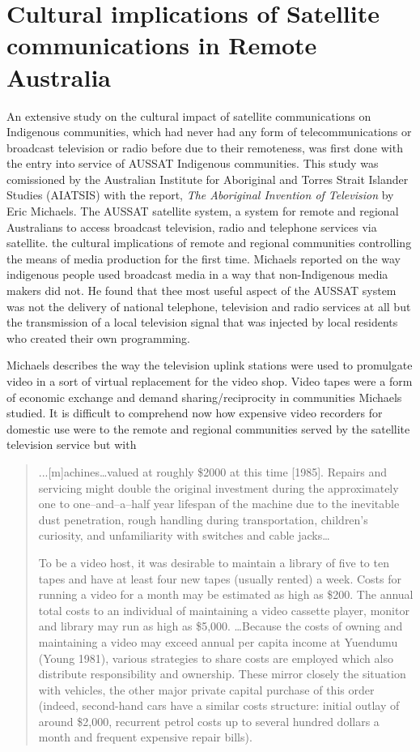 \section{Cultural implications of Satellite communications in Remote Australia}
An extensive study on the cultural impact of satellite communications on Indigenous communities, which had never had any form of telecommunications or broadcast television or radio before due to their remoteness, was first done with the entry into service of AUSSAT Indigenous communities. This study was comissioned by the Australian Institute for Aboriginal and Torres Strait Islander Studies (AIATSIS) with the report, \emph{The Aboriginal Invention of Television} by Eric Michaels\cite{RefWorks:25}.
The AUSSAT satellite system, a system for remote and regional Australians to access broadcast television, radio and telephone services via satellite\cite{RefWorks:60}.  the cultural implications of remote and regional communities controlling the means of media production for the first time.  Michaels reported on the way indigenous people used broadcast media in a way that non-Indigenous media makers did not. He found that thee most useful aspect of the AUSSAT system was not the delivery of national telephone, television and radio services at all but the transmission of a local television signal that was injected by local residents who created their own programming. 

Michaels describes the way the television uplink stations were used to promulgate video in a sort of virtual replacement for the video shop. Video tapes were a form of economic exchange and demand sharing/reciprocity in communities Michaels studied.  It is difficult to comprehend now how expensive video recorders for domestic use were to the remote and regional communities served by the satellite television service but with
\begin{quotation}
...[m]achines\ldots valued at roughly \$2000 at this time [1985]. Repairs and servicing might double the original investment during the approximately one to one--and--a--half year lifespan of the machine due to the inevitable dust penetration, rough handling during transportation, children's curiosity, and unfamiliarity with switches and cable jacks\ldots

To be a video host, it was desirable to maintain a library of five to ten tapes and have at least four new tapes (usually rented) a week. Costs for running a video for a month may be estimated as high as \$200. The annual total costs to an individual of maintaining a video cassette player, monitor and library may run as high as \$5,000.
\ldots Because the costs of owning and maintaining a video may exceed annual per capita income at Yuendumu (Young 1981), various strategies to share costs are employed which also distribute responsibility and ownership. These mirror closely the situation with vehicles, the other major private capital purchase of this order (indeed, second-hand cars have a similar costs structure: initial outlay of around \$2,000, recurrent petrol costs up to several hundred dollars a month and frequent expensive repair bills)\cite[p.42]{RefWorks:25}.
\end{quotation} 


